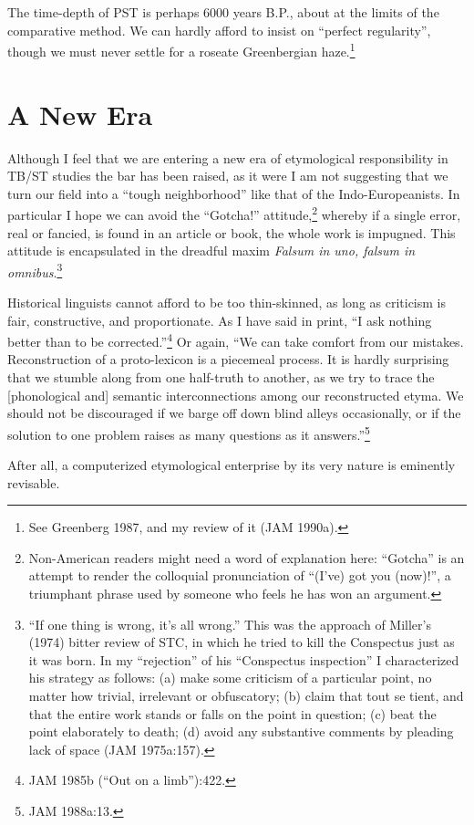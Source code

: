 The time-depth of PST is perhaps 6000 years B.P., about at the limits of the comparative method. We can hardly afford to insist on “perfect regularity”, though we must never settle for a roseate Greenbergian haze.\footnote{See Greenberg 1987, and my review of it (JAM 1990a).}


\section*{A New Era}
Although I feel that we are entering a new era of etymological
responsibility in TB/ST studies  the bar has been raised, as it were
I am not suggesting that we turn our field into a “tough neighborhood”
like that of the Indo-Europeanists. In particular I hope we can avoid
the “Gotcha!” attitude,\footnote{Non-American readers might need a
  word of explanation here: “Gotcha” is an attempt to render the
  colloquial pronunciation of “(I’ve) got you (now)!”, a triumphant
  phrase used by someone who feels he has won an argument.} whereby if
a single error, real or fancied, is found in an article or book, the
whole work is impugned. This attitude is encapsulated in the dreadful
maxim {\it Falsum in uno, falsum in omnibus}.\footnote{ “If one thing
  is wrong, it’s all wrong.” This was the approach of Miller’s
 (1974) bitter review of STC, in which he tried to kill the Conspectus just as it was born. In my “rejection” of his “Conspectus inspection” I characterized his strategy as follows: (a) make some criticism of a particular point, no matter how trivial, irrelevant or obfuscatory; (b) claim that tout se tient, and that the entire work stands or falls on the point in question; (c) beat the point elaborately to death; (d) avoid any substantive comments by pleading lack of space (JAM 1975a:157).}

Historical linguists cannot afford to be too thin-skinned, as long as criticism is fair, constructive, and proportionate. As I have said in print, “I ask nothing better than to be corrected.”\footnote{JAM 1985b (“Out on a limb”):422.} Or again, “We can take comfort from our mistakes. Reconstruction of a proto-lexicon is a piecemeal process. It is hardly surprising that we stumble along from one half-truth to another, as we try to trace the [phonological and] semantic interconnections among our reconstructed etyma. We should not be discouraged if we barge off down blind alleys occasionally, or if the solution to one problem raises as many questions as it answers.”\footnote{JAM 1988a:13.}

After all, a computerized etymological enterprise by its very nature is eminently revisable.

